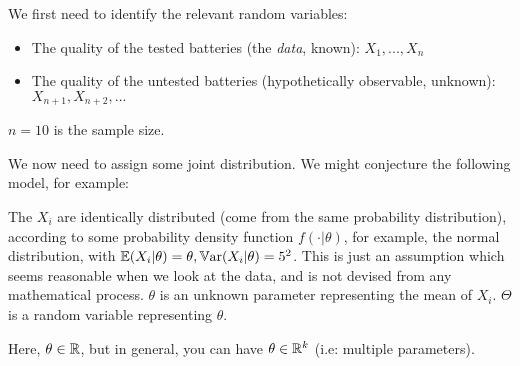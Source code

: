 \documentclass[a4paper]{article}
\begin{document}
                We first need to identify the relevant random variables:

                \begin{itemize}
                    \item The quality of the tested batteries (the
                        \textit{data}, known): $X_1, ..., X_n$
                    \item The quality of the untested batteries (hypothetically
                        observable, unknown): $X_{n+1}, X_{n+2}, ...$
                \end{itemize}

                $n = 10$ is the sample size.

                We now need to assign some joint distribution. We might
                conjecture the following model, for example:

                The $X_i$ are identically distributed (come from the same
                probability distribution), according to some probability density
                function $f(\cdot | \theta)$, for example, the normal
                distribution, with $\mathbb{E}(X_i | \theta) = \theta, \mathbb{V}\text{ar}(X_i |
                \theta) = 5^2$. This is just an assumption which seems
                reasonable when we look at the data, and is not devised from any
                mathematical process. $\theta$ is an unknown parameter
                representing the mean of $X_i$. $\Theta$ is a random variable
                representing $\theta$.

                Here, $\theta \in \mathbb{R}$, but in general, you can have $\theta \in
                \mathbb{R}^k$ (i.e: multiple parameters).
\end{document}
